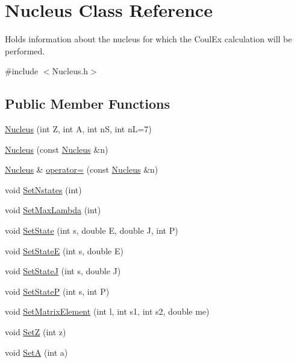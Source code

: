 \hypertarget{classNucleus}{\section{Nucleus Class Reference}
\label{classNucleus}
}


Holds information about the nucleus for which the Coul\-Ex calculation will be performed.  




{\ttfamily \#include $<$Nucleus.\-h$>$}

\subsection*{Public Member Functions}
\begin{DoxyCompactItemize}
\item 
\hyperlink{classNucleus_ac2742378563d80008df3826b95395643}{Nucleus} (int Z, int A, int n\-S, int n\-L=7)
\item 
\hyperlink{classNucleus_afc84ef7342c70caec505fe56d765e4ae}{Nucleus} (const \hyperlink{classNucleus}{Nucleus} \&n)
\item 
\hyperlink{classNucleus}{Nucleus} \& \hyperlink{classNucleus_ab093d4b22255c1d37199707cc90ed404}{operator=} (const \hyperlink{classNucleus}{Nucleus} \&n)
\item 
void \hyperlink{classNucleus_aa48a728dcb4dc35dc13786d33bb21bc5}{Set\-Nstates} (int)
\item 
void \hyperlink{classNucleus_ae25ff1bec73c4beb4f8dfb4f849da450}{Set\-Max\-Lambda} (int)
\item 
void \hyperlink{classNucleus_a768c3938464bbd81c8d74ce2e1aa19ea}{Set\-State} (int s, double E, double J, int P)
\item 
void \hyperlink{classNucleus_ac8385f9efc4969b5f8c8eafea85d10fe}{Set\-State\-E} (int s, double E)
\item 
void \hyperlink{classNucleus_a001e9aa70fa2c89203596763527ca21a}{Set\-State\-J} (int s, double J)
\item 
void \hyperlink{classNucleus_a81b9a661f8e7cf4a36a8c73054bac261}{Set\-State\-P} (int s, int P)
\item 
void \hyperlink{classNucleus_a1b149518d6eaf8c5c8b222318cafb7ef}{Set\-Matrix\-Element} (int l, int s1, int s2, double me)
\item 
void \hyperlink{classNucleus_a33eaf2fef4f8980753be2b4ec787a8f9}{Set\-Z} (int z)
\item 
void \hyperlink{classNucleus_ae830f7fce83a6d6d77f2ea81fdde2546}{Set\-A} (int a)

\end{DoxyCompactItemize}
